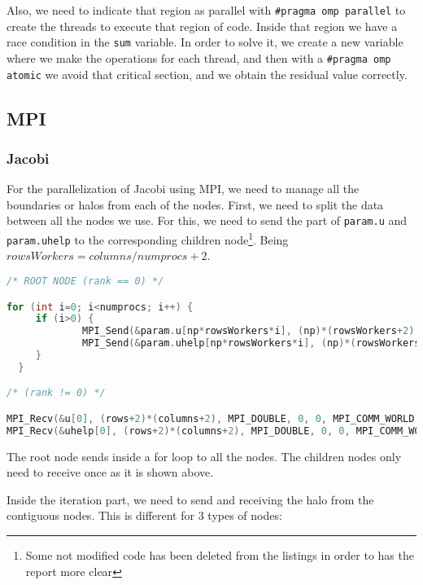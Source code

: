 \documentclass[a4paper, 10pt]{article}
\begin{document}
  Also, we need to indicate that region as parallel with \texttt{\#pragma omp parallel} to create the threads to execute that region of code. Inside that region we have a race condition in the \texttt{sum} variable. In order to solve it, we create a new variable where we make the operations for each thread, and then with a \texttt{\#pragma omp atomic} we avoid that critical section, and we obtain the residual value correctly.

\clearpage

\subsection{MPI}

\subsubsection{Jacobi}

For the parallelization of Jacobi using MPI, we need to manage all the boundaries or halos from each of the nodes. First, we need to split the data between all the nodes we use. For this, we need to send the part of \texttt{param.u} and \texttt{param.uhelp} to the corresponding children node\footnote{Some not modified code has been deleted from the listings in order to has the report more clear}. Being $rowsWorkers = columns / numprocs + 2$.

\begin{lstlisting}[language=c, caption={Sending/Receiving initial data to all nodes}]
/* ROOT NODE (rank == 0) */

for (int i=0; i<numprocs; i++) {
     if (i>0) {
             MPI_Send(&param.u[np*rowsWorkers*i], (np)*(rowsWorkers+2), MPI_DOUBLE, i, 0, MPI_COMM_WORLD);
             MPI_Send(&param.uhelp[np*rowsWorkers*i], (np)*(rowsWorkers+2), MPI_DOUBLE, i, 0, MPI_COMM_WORLD);
     }
  }    

/* (rank != 0) */

MPI_Recv(&u[0], (rows+2)*(columns+2), MPI_DOUBLE, 0, 0, MPI_COMM_WORLD, &status);
MPI_Recv(&uhelp[0], (rows+2)*(columns+2), MPI_DOUBLE, 0, 0, MPI_COMM_WORLD, &status);
\end{lstlisting}

The root node sends inside a for loop to all the nodes. The children nodes only need to receive once as it is shown above.


Inside the iteration part, we need to send and receiving the halo from the contiguous nodes. This is different for 3 types of nodes:
\end{document}
